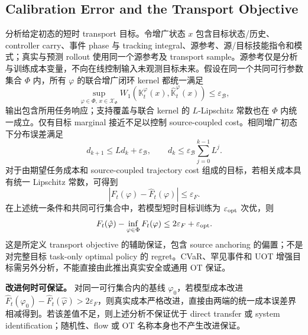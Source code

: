 \documentclass[11pt]{article}
\begin{document}
\subsection{Calibration Error and the Transport Objective}
分析给定初态的短时 transport 目标。令增广状态 $x$ 包含目标状态/历史、controller carry、事件 phase 与 tracking integral、源参考、源/目标技能指令和模式；真实与预测 rollout 使用同一个源参考及 transport sample。源参考仅是分析与训练成本变量，不向在线控制输入未观测目标未来。假设在同一个共同可行参数集合 $\Phi$ 内，所有 $\varphi$ 的联合增广闭环 kernel 都统一满足
\begin{equation}
 \sup_{\varphi\in\Phi,\,x\in\mathcal X_\Phi}
 W_1(\mathbb K_t^\varphi(x),\widehat{\mathbb K}_t^\varphi(x))
 \le\varepsilon_{\mathcal B},
\end{equation}
输出包含所用任务响应；支持覆盖与联合 kernel 的 $L$-Lipschitz 常数也在 $\Phi$ 内统一成立。仅有目标 marginal 接近不足以控制 source-coupled cost。相同增广初态下分布误差满足
\begin{equation}
 d_{k+1}\le Ld_k+\varepsilon_{\mathcal B},\qquad
 d_k\le\varepsilon_{\mathcal B}\sum_{j=0}^{k-1}L^j.
 \label{eq:propagation}
\end{equation}
对于由期望任务成本和 source-coupled trajectory cost 组成的目标，若相关成本具有统一 Lipschitz 常数，可得到
\begin{equation}
 |F_t(\varphi)-\widehat F_t(\varphi)|\le\varepsilon_F.
\end{equation}
在上述统一条件和共同可行集合中，若模型短时目标训练为 $\varepsilon_{\rm opt}$ 次优，则
\begin{equation}
 F_t(\hat\varphi)-\inf_{\varphi\in\Phi}F_t(\varphi)
 \le2\varepsilon_F+\varepsilon_{\rm opt}.
 \label{eq:objectivebound}
\end{equation}
这是所定义 transport objective 的辅助保证，包含 source anchoring 的偏置；不是对完整目标 task-only optimal policy 的 regret。CVaR、罕见事件和 UOT 增强目标需另外分析，不能直接由此推出真实安全或通用 OT 保证。

\textbf{改进何时可保证。} 对同一可行集合内的基线 $\varphi_0$，若模型成本改进 $\widehat F_t(\varphi_0)-\widehat F_t(\hat\varphi)>2\varepsilon_F$，则真实成本严格改进，直接由两端的统一成本误差界相减得到。若该差值不足，则上述分析不保证优于 direct transfer 或 system identification；随机性、flow 或 OT 名称本身也不产生改进保证。


\end{document}
